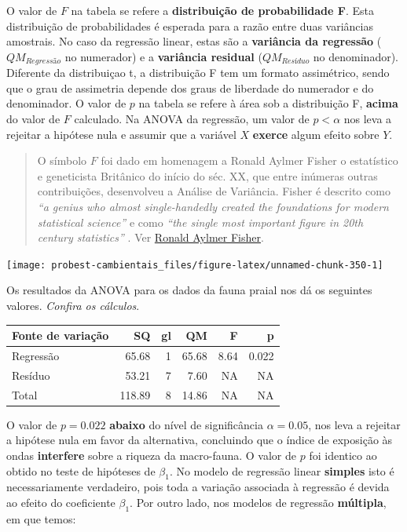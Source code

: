 \documentclass[
]{book}
\begin{document}
O valor de \(F\) na tabela se refere a \textbf{distribuição de probabilidade F}. Esta distribuição de probabilidades é esperada para a razão entre duas variâncias amostrais. No caso da regressão linear, estas são a \textbf{variância da regressão} (\(QM_{Regressão}\) no numerador) e a \textbf{variância residual} (\(QM_{Resíduo}\) no denominador). Diferente da distribuiçao t, a distribuição F tem um formato assimétrico, sendo que o grau de assimetria depende dos graus de liberdade do numerador e do denominador. O valor de \(p\) na tabela se refere à área sob a distribuição F, \textbf{acima} do valor de \(F\) calculado. Na ANOVA da regressão, um valor de \(p < \alpha\) nos leva a rejeitar a hipótese nula e assumir que a variável \(X\) \textbf{exerce} algum efeito sobre \(Y\).

\begin{quote}
O símbolo \(F\) foi dado em homenagem a Ronald Aylmer Fisher o estatístico e geneticista Britânico do início do séc. XX, que entre inúmeras outras contribuições, desenvolveu a Análise de Variância. Fisher é descrito como \emph{``a genius who almost single-handedly created the foundations for modern statistical science''} \citep{halt1998history} e como \emph{``the single most important figure in 20th century statistics''} \citep{efron1998r}. Ver \href{https://en.wikipedia.org/wiki/Ronald_Fisher}{Ronald Aylmer Fisher}.
\end{quote}

\begin{center}\texttt{[image: probest-cambientais\_files/figure-latex/unnamed-chunk-350-1]} \end{center}

Os resultados da ANOVA para os dados da fauna praial nos dá os seguintes valores. \emph{Confira os cálculos}.

\begin{tabular}{l|r|r|r|r|r}
\hline
Fonte de variação & SQ & gl & QM & F & p\\
\hline
Regressão & 65.68 & 1 & 65.68 & 8.64 & 0.022\\
\hline
Resíduo & 53.21 & 7 & 7.60 & NA & NA\\
\hline
Total & 118.89 & 8 & 14.86 & NA & NA\\
\hline
\end{tabular}

O valor de \(p = 0.022\) \textbf{abaixo} do nível de significância \(\alpha = 0.05\), nos leva a rejeitar a hipótese nula em favor da alternativa, concluindo que o índice de exposição às ondas \textbf{interfere} sobre a riqueza da macro-fauna. O valor de \(p\) foi identico ao obtido no teste de hipóteses de \(\beta_1\). No modelo de regressão linear \textbf{simples} isto é necessariamente verdadeiro, pois toda a variação associada à regressão é devida ao efeito do coeficiente \(\beta_1\). Por outro lado, nos modelos de regressão \textbf{múltipla}, em que temos:
\end{document}
